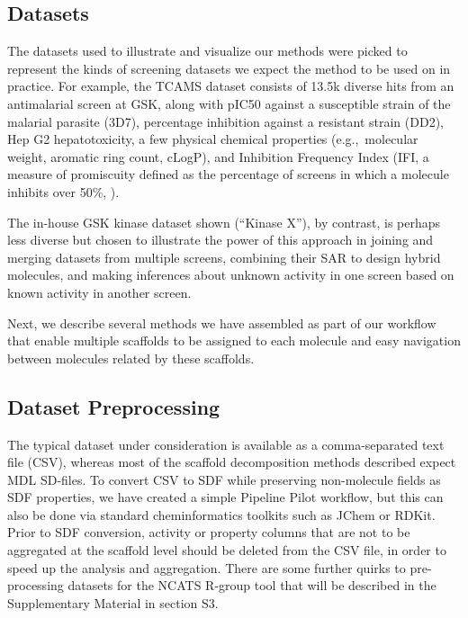 \documentclass[journal=jacsat,manuscript=article]{achemso}
\newcommand*\tref[1]{Table~\ref{table:#1}}
\newcommand*\eg{e.g.,~}
\begin{document}
\subsection{Datasets}
\label{sec:datasets}
The datasets used to illustrate and visualize our methods were picked
to represent the kinds of screening datasets we expect the method to
be used on in practice. For example, the TCAMS dataset\cite{Gamo2010}
consists of 13.5k diverse hits from an antimalarial screen at GSK,
along with pIC50 against a susceptible strain of the malarial parasite
(3D7), percentage inhibition against a resistant strain (DD2), Hep G2
hepatotoxicity, a few physical chemical properties (\eg molecular
weight, aromatic ring count, cLogP), and Inhibition Frequency Index
(IFI, a measure of promiscuity defined as the percentage of screens in
which a molecule inhibits over 50\%, \cite{Chakravorty2013IFI}).

The in-house GSK kinase dataset shown (``Kinase X''), by contrast, is perhaps less
diverse but chosen to illustrate the power of this approach in joining
and merging datasets from multiple screens, combining their SAR to
design hybrid molecules, and making inferences about unknown activity
in one screen based on known activity in another screen.


Next, we describe several methods we have assembled as part of our
workflow that enable multiple scaffolds to be assigned to each
molecule and easy navigation between molecules related by these
scaffolds.


\subsection{Dataset Preprocessing}
\label{sec:prepro}
The typical dataset under consideration is available as a
comma-separated text file (CSV), whereas most of the scaffold
decomposition methods described expect MDL SD-files. To convert CSV to
SDF while preserving non-molecule fields as SDF properties, we have
created a simple Pipeline Pilot workflow, but this can also be done
via standard cheminformatics toolkits such as JChem or RDKit. Prior to
SDF conversion, activity or property columns that are not to be
aggregated at the scaffold level should be deleted from the CSV file,
in order to speed up the analysis and aggregation.  There are some
further quirks to pre-processing datasets for the NCATS R-group tool
that will be described in the Supplementary Material in section S3.
\end{document}
